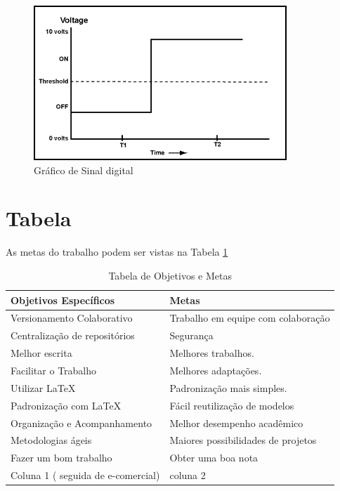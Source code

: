 \begin{figure}[h]
    \centering
    \includegraphics[width=0.85\textwidth]{images/voltage}
    \caption{Gráfico de Sinal digital \cite{centralconnecticutstateuniversity2015}}
    \label{fig:voltage}
\end{figure}

\newpage
\section{Tabela}

As metas do trabalho podem ser vistas na Tabela \ref{table:met}
\begin{table}[h]
\centering
\begin{tabular}{|l | l|}
\hline
\textbf{Objetivos Específicos} & \textbf{Metas}\\
\hline
Versionamento Colaborativo & Trabalho em equipe com colaboração \\
\hline
Centralização de repositórios & Segurança\\
\hline
Melhor escrita & Melhores trabalhos.\\
\hline
Facilitar o Trabalho & Melhores adaptações.\\
\hline
Utilizar \LaTeX & Padronização mais simples.\\
\hline
Padronização com \LaTeX & Fácil reutilização de modelos\\
\hline
Organização e Acompanhamento  & Melhor desempenho acadêmico\\
\hline
Metodologias ágeis & Maiores possibilidades de projetos\\
\hline
Fazer um bom trabalho & Obter uma boa nota\\
\hline
Coluna 1 ( seguida de e-comercial) & coluna 2\\
\hline
\end{tabular}
\caption{Tabela de Objetivos e Metas}
\label{table:met}
\end{table}

